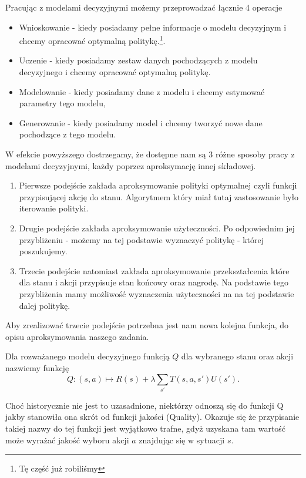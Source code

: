 \documentclass[10pt,a4paper]{book}
\begin{document}
\begin{remark}
Pracując z modelami decyzyjnymi możemy przeprowadzać łącznie 4 operacje
\begin{itemize}
\item Wnioskowanie - kiedy posiadamy pełne informacje o modelu decyzyjnym i chcemy opracować optymalną politykę.\footnote{Tę część już robiliśmy}.
\item Uczenie - kiedy posiadamy zestaw danych pochodzących z modelu decyzyjnego i chcemy opracować optymalną politykę.
\item Modelowanie - kiedy posiadamy dane z modelu i chcemy estymować parametry tego modelu,
\item Generowanie - kiedy posiadamy model i chcemy tworzyć nowe dane pochodzące z tego modelu.
\end{itemize}
\end{remark}

W efekcie powyższego dostrzegamy, że dostępne nam są 3 różne sposoby pracy z modelami decyzyjnymi, każdy poprzez aproksymację innej składowej.

\begin{enumerate}
\item Pierwsze podejście zakłada aproksymowanie polityki optymalnej czyli funkcji przypisującej akcję do stanu. Algorytmem który miał tutaj zastosowanie było iterowanie polityki.
\item Drugie podejście zakłada aproksymowanie użyteczności. Po odpowiednim jej przybliżeniu - możemy na tej podstawie wyznaczyć politykę - której poszukujemy.
\item Trzecie podejście natomiast zakłada aproksymowanie przekształcenia które dla stanu i akcji przypisuje stan końcowy oraz nagrodę. Na podstawie tego przybliżenia mamy możliwość wyznaczenia użyteczności na na tej podstawie dalej politykę.
\end{enumerate}

Aby zrealizować trzecie podejście potrzebna jest nam nowa kolejna funkcja, do opisu aproksymowania naszego zadania.


\begin{definition}[Funkcja Q]
Dla rozważanego modelu decyzyjnego funkcją $Q$ dla wybranego stanu oraz akcji nazwiemy funkcję
$$
Q : (s,a) \mapsto R(s) + \lambda \sum_{s'} T(s,a,s') U(s').
$$
\end{definition}

\begin{remark*}
Choć historycznie nie jest to uzasadnione, niektórzy odnoszą się do funkcji Q jakby stanowiła ona skrót od funkcji jakości (Quality). Okazuje się że przypisanie takiej nazwy do tej funkcji jest wyjątkowo trafne, gdyż uzyskana tam wartość może wyrażać jakość wyboru akcji $a$ znajdując się w sytuacji $s$.
\end{remark*}
\end{document}
